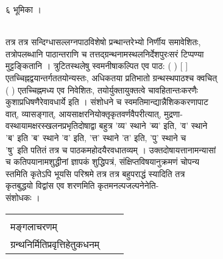 \documentclass[11pt, openany]{book}
\begin{document}
{{{{{{{{{{{{६ }{भूमिका ।}{\\
तत्र तत्र सन्दिग्धासल्लग्नपाठविशेषो प्रन्थान्तरेभ्यो निर्णीय
समावेशितः,\\
तत्रोपलब्धानि पाठान्तराणि च तत्तद्ग्रन्थनामस्थलनिर्देशपुरःसरं
टिप्पण्या\\
मुट्टङ्कितानि । त्रुटितस्थलेषु स्वमनीषाकल्पित एव पाठ: ( ) {[} {]}\\
एतच्चिह्नद्वयान्तर्गततयोन्यस्तः, अधिकतया प्रतिभातो ग्रन्थस्थपाठश्च
क्वचित्\\
( ) एतच्चिह्नमध्य एव निवेशितः, तयोर्युक्तायुक्तत्वे चावहितान्तःकरणैः\\
कुशाप्रधिषणैरेवावधार्ये इति । संशोधने च स्वमतिमान्द्यान्नैशिककरणापाट\\
वात्, व्यासङ्गात्, आयसाक्षरनियोक्तृकृतवर्णवैपरीत्यात्, मुद्रणा-\\
वस्थायामक्षरस्खलनप्रभृतिदोषाद्वा बहुत्र 'व्य' स्थाने 'ब्य' इति, 'व'
स्थाने\\
'ब' इति 'ब' स्थाने 'व' इति, 'त्त' स्थाने 'त' इति, 'पु' स्थाने च\\
'षु' इति पतितं तत्र च पाठकमहोदयैरवधातव्यम् । उक्तदोषायत्तानामन्यासां\\
च कतिपयानामशुद्धीनां ज्ञापकं शुद्धिपत्रं, संक्षिप्तविषयानुक्रमणं
चोपन्य\\
स्तमिति कृतेऽपि भूयसि परिश्रमे तत्र तत्र बहुपराद्धं स्यादिति तत्र\\
कृतबुद्धयो विद्वांस एव शरणमिति कृतमनल्पजल्पनेनेति-\\


 संशोधकः ।

\begin{longtable}[]{@{}lll@{}}
\toprule
\endhead
\begin{minipage}[t]{0.30\columnwidth}\raggedright
{विषयः\\
मङ्गलाचरणम्\\
ग्रन्थनिर्मितिप्रवृत्तिहेतुकधनम् 

}
\end{minipage}
\end{longtable}}}}}}}}}}}}}
\end{document}
